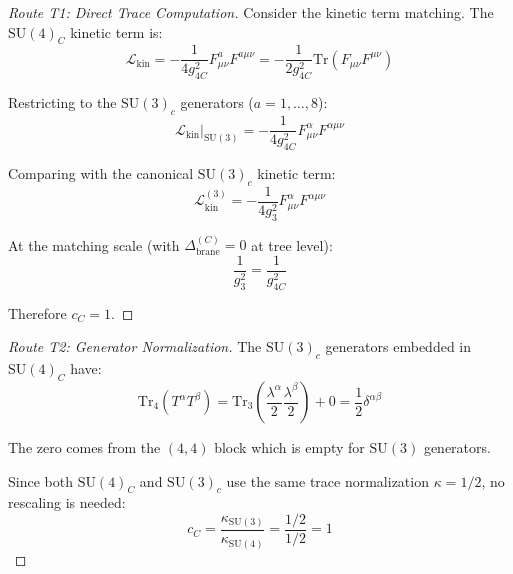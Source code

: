 \documentclass[11pt,a4paper]{article}
\theoremstyle{definition}
\begin{document}
\begin{proof}[Route T1: Direct Trace Computation]
Consider the kinetic term matching. The $\text{SU}(4)_C$ kinetic term is:
\begin{equation}
  \label{eq:su4-kinetic}
  \mathcal{L}_{\text{kin}} = -\frac{1}{4g_{4C}^2} F_{\mu\nu}^a F^{a\mu\nu}
  = -\frac{1}{2g_{4C}^2} \text{Tr}(F_{\mu\nu} F^{\mu\nu})
\end{equation}

Restricting to the $\text{SU}(3)_c$ generators ($a = 1, \ldots, 8$):
\begin{equation}
  \label{eq:su3-restrict}
  \mathcal{L}_{\text{kin}}|_{\text{SU}(3)} = -\frac{1}{4g_{4C}^2} F_{\mu\nu}^{\alpha} F^{\alpha\mu\nu}
\end{equation}

Comparing with the canonical $\text{SU}(3)_c$ kinetic term:
\begin{equation}
  \label{eq:su3-canonical}
  \mathcal{L}_{\text{kin}}^{(3)} = -\frac{1}{4g_3^2} F_{\mu\nu}^{\alpha} F^{\alpha\mu\nu}
\end{equation}

At the matching scale (with $\Delta_{\text{brane}}^{(C)} = 0$ at tree level):
\begin{equation}
  \label{eq:matching-tree}
  \frac{1}{g_3^2} = \frac{1}{g_{4C}^2}
\end{equation}

Therefore $c_C = 1$.
\end{proof}

\begin{proof}[Route T2: Generator Normalization]
The $\text{SU}(3)_c$ generators embedded in $\text{SU}(4)_C$ have:
\begin{equation}
  \label{eq:t2-trace}
  \text{Tr}_4(T^{\alpha} T^{\beta}) = \text{Tr}_3\left(\frac{\lambda^{\alpha}}{2}\frac{\lambda^{\beta}}{2}\right) + 0 = \frac{1}{2}\delta^{\alpha\beta}
\end{equation}

The zero comes from the $(4,4)$ block which is empty for $\text{SU}(3)$ generators.

Since both $\text{SU}(4)_C$ and $\text{SU}(3)_c$ use the same trace normalization
$\kappa = 1/2$, no rescaling is needed:
\begin{equation}
  \label{eq:t2-cc}
  c_C = \frac{\kappa_{\text{SU}(3)}}{\kappa_{\text{SU}(4)}} = \frac{1/2}{1/2} = 1
\end{equation}
\end{proof}
\end{document}

